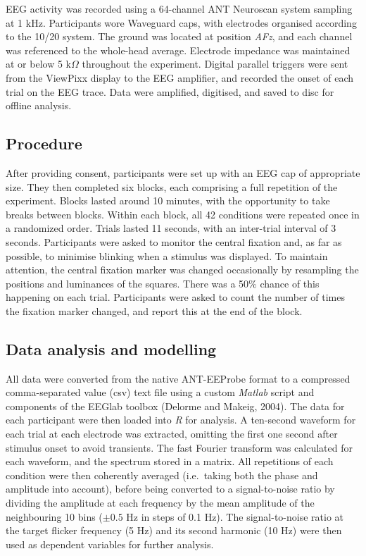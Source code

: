 \documentclass[]{article}
\begin{document}
EEG activity was recorded using a 64-channel ANT Neuroscan system sampling at 1 kHz. Participants wore Waveguard caps, with electrodes organised according to the 10/20 system. The ground was located at position \emph{AFz}, and each channel was referenced to the whole-head average. Electrode impedance was maintained at or below 5 k\(\Omega\) throughout the experiment. Digital parallel triggers were sent from the ViewPixx display to the EEG amplifier, and recorded the onset of each trial on the EEG trace. Data were amplified, digitised, and saved to disc for offline analysis.

\hypertarget{procedure}{%
\subsection{Procedure}\label{procedure}}

After providing consent, participants were set up with an EEG cap of appropriate size. They then completed six blocks, each comprising a full repetition of the experiment. Blocks lasted around 10 minutes, with the opportunity to take breaks between blocks. Within each block, all 42 conditions were repeated once in a randomized order. Trials lasted 11 seconds, with an inter-trial interval of 3 seconds. Participants were asked to monitor the central fixation and, as far as possible, to minimise blinking when a stimulus was displayed. To maintain attention, the central fixation marker was changed occasionally by resampling the positions and luminances of the squares. There was a 50\% chance of this happening on each trial. Participants were asked to count the number of times the fixation marker changed, and report this at the end of the block.

\hypertarget{data-analysis-and-modelling}{%
\subsection{Data analysis and modelling}\label{data-analysis-and-modelling}}

All data were converted from the native ANT-EEProbe format to a compressed comma-separated value (csv) text file using a custom \emph{Matlab} script and components of the EEGlab toolbox (Delorme and Makeig, 2004). The data for each participant were then loaded into \emph{R} for analysis. A ten-second waveform for each trial at each electrode was extracted, omitting the first one second after stimulus onset to avoid transients. The fast Fourier transform was calculated for each waveform, and the spectrum stored in a matrix. All repetitions of each condition were then coherently averaged (i.e.~taking both the phase and amplitude into account), before being converted to a signal-to-noise ratio by dividing the amplitude at each frequency by the mean amplitude of the neighbouring 10 bins (\(\pm0.5\) Hz in steps of 0.1 Hz). The signal-to-noise ratio at the target flicker frequency (5 Hz) and its second harmonic (10 Hz) were then used as dependent variables for further analysis.
\end{document}
